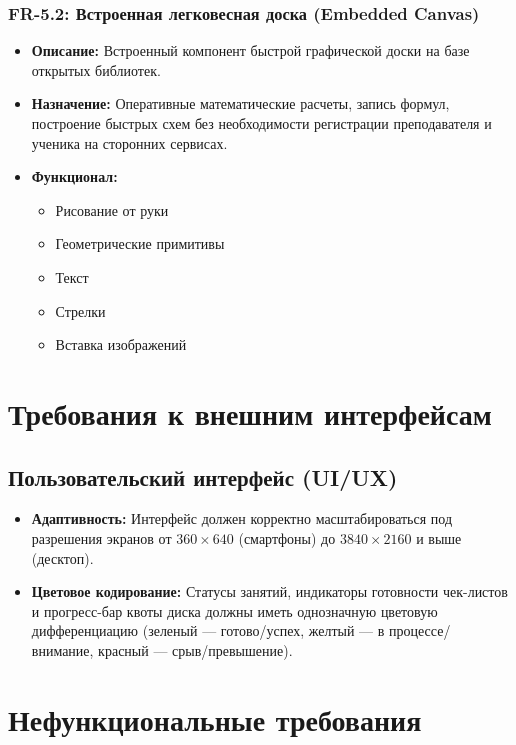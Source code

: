 \documentclass[12pt,a4paper]{article}
\begin{document}
\subsubsection*{FR-5.2: Встроенная легковесная доска (Embedded Canvas)}
\begin{itemize}
    \item \textbf{Описание:} Встроенный компонент быстрой графической доски на базе открытых библиотек.
    \item \textbf{Назначение:} Оперативные математические расчеты, запись формул, построение быстрых схем без необходимости регистрации преподавателя и ученика на сторонних сервисах.
    \item \textbf{Функционал:}
          \begin{itemize}[label=---]
              \item Рисование от руки
              \item Геометрические примитивы
              \item Текст
              \item Стрелки
              \item Вставка изображений
          \end{itemize}
\end{itemize}

\section{Требования к внешним интерфейсам}

\subsection{Пользовательский интерфейс (UI/UX)}
\begin{itemize}
    \item \textbf{Адаптивность:} Интерфейс должен корректно масштабироваться под разрешения экранов от $360\times640$ (смартфоны) до $3840\times2160$ и выше (десктоп).
    \item \textbf{Цветовое кодирование:} Статусы занятий, индикаторы готовности чек-листов и прогресс-бар квоты диска должны иметь однозначную цветовую дифференциацию (зеленый — готово/успех, желтый — в процессе/внимание, красный — срыв/превышение).
\end{itemize}

\section{Нефункциональные требования}
\end{document}

